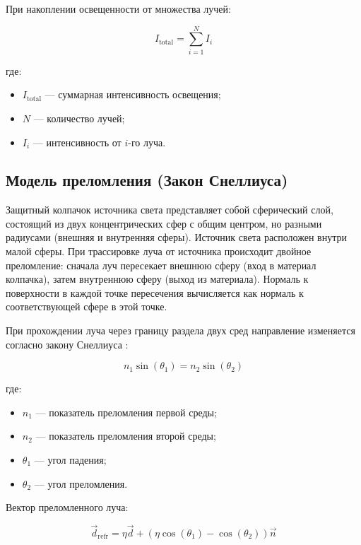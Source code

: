 При накоплении освещенности от множества лучей:

\begin{equation}
I_{\text{total}} = \sum_{i=1}^{N} I_i
\end{equation}

где:
\begin{itemize}
    \item $I_{\text{total}}$ --- суммарная интенсивность освещения;
    \item $N$ --- количество лучей;
    \item $I_i$ --- интенсивность от $i$-го луча.
\end{itemize}

\subsection{Модель преломления (Закон Снеллиуса)}

Защитный колпачок источника света представляет собой сферический слой, состоящий из двух концентрических сфер с общим центром, но разными радиусами (внешняя и внутренняя сферы). Источник света расположен внутри малой сферы. При трассировке луча от источника происходит двойное преломление: сначала луч пересекает внешнюю сферу (вход в материал колпачка), затем внутреннюю сферу (выход из материала). Нормаль к поверхности в каждой точке пересечения вычисляется как нормаль к соответствующей сфере в этой точке.

При прохождении луча через границу раздела двух сред направление изменяется согласно закону Снеллиуса \cite{3}:

\begin{equation}
n_1 \sin(\theta_1) = n_2 \sin(\theta_2)
\end{equation}

где:
\begin{itemize}
    \item $n_1$ --- показатель преломления первой среды;
    \item $n_2$ --- показатель преломления второй среды;
    \item $\theta_1$ --- угол падения;
    \item $\theta_2$ --- угол преломления.
\end{itemize}

Вектор преломленного луча:

\begin{equation}
\vec{d}_{\text{refr}} = \eta \vec{d} + (\eta \cos(\theta_1) - \cos(\theta_2)) \vec{n}
\end{equation}

